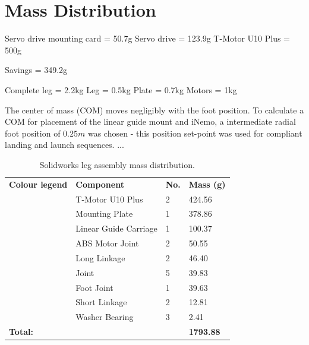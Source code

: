 \section{Mass Distribution}



Servo drive mounting card = 50.7g
Servo drive = 123.9g
T-Motor U10 Plus = 500g

Savings = 349.2g

Complete leg = 2.2kg
Leg = 0.5kg
Plate = 0.7kg
Motors = 1kg

The center of mass (COM) moves negligibly with the foot position. To calculate a COM for placement of the linear guide mount and iNemo, a intermediate radial foot position of $0.25 m$ was chosen - this position set-point was used for compliant landing and launch sequences. ...

\begin{table}[]
\centering
\begin{tabular}{llll}
\textbf{Colour legend}                          & \textbf{Component}    & \textbf{No.} & \textbf{Mass (g)} \\
\cellcolor[HTML]{FE0000}                        & T-Motor U10 Plus      & 2            & 424.56            \\
\cellcolor[HTML]{CB0000}                        & Mounting Plate        & 1            & 378.86            \\
\cellcolor[HTML]{010066}{\color[HTML]{000000} } & Linear Guide Carriage & 1            & 100.37            \\
\cellcolor[HTML]{3531FF}                        & ABS Motor Joint       & 2            & 50.55             \\
\cellcolor[HTML]{3531FF}                        & Long Linkage          & 2            & 46.40             \\
\cellcolor[HTML]{3531FF}                        & Joint                 & 5            & 39.83             \\
\cellcolor[HTML]{3531FF}                        & Foot Joint            & 1            & 39.63             \\
\cellcolor[HTML]{3531FF}                        & Short Linkage         & 2            & 12.81             \\
\cellcolor[HTML]{3531FF}                        & Washer Bearing        & 3            & 2.41              \\
\textbf{Total:}                                 & \textbf{}             & \textbf{}    & \textbf{1793.88} 
\end{tabular}
\caption{Solidworks leg assembly mass distribution.}
\label{tbl:Solidworks leg assembly mass distribution}
\end{table}

